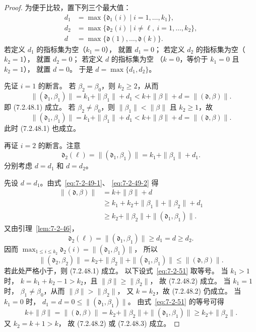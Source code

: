 \begin{proof}
为便于比较，置下列三个最大值：
\[
\begin{aligned}
d_1&=\max\{\mathfrak d_1(i)\mid i=1,\ldots,k_1\},\\
d_2&=\max\{\mathfrak d_2(i)\mid i\ne\ell,
\ i=1,\ldots,k_2\},\\
d&=\max\{\mathfrak d(1),\ldots,\mathfrak d(k)\}.
\end{aligned}
\]
若定义 $d_1$ 的指标集为空（$k_1=0$），
就置 $d_1=0$；
若定义 $d_2$ 的指标集为空（$k_2=1$），
就置 $d_2=0$；
若定义 $d$ 的指标集为空
（$k=0$，等价于 $k_1=0$ 且 $k_2=1$），
就置 $d=0$。
于是 $d=\max\{d_1,d_2\}$。

先证 $i=1$ 的断言。
若 $\beta_2=\beta_0$，则 $k_2\ge2$，从而
\[
\|(\mathfrak d_1,\beta_1)\|
=k_1+\|\beta_1\|+d_1
<k+\|\beta\|+d
=\|(\mathfrak d,\beta)\|.
\]
即 (7.2.48.1) 成立。
若 $\beta_2\ne\beta_0$，则
$\|\beta_1\|<\|\beta\|$ 且 $k_2\ge1$，故
\[
\|(\mathfrak d_1,\beta_1)\|
=k_1+\|\beta_1\|+d_1
<k+\|\beta\|+d
=\|(\mathfrak d,\beta)\|.
\]
此时 (7.2.48.1) 也成立。

再证 $i=2$ 的断言。注意
\[
\mathfrak d_2(\ell)
=\|(\mathfrak d_1,\beta_1)\|
=k_1+\|\beta_1\|+d_1.
\]
分别考虑 $d=d_1$ 和 $d=d_2$。

先设 $d=d_1$。由式~\eqref{eq:7-2-49-1}、
\eqref{eq:7-2-49-2} 得
\[
\begin{aligned}
\|(\mathfrak d,\beta)\|
&=k+\|\beta\|+d\\
&\ge k_1+k_2+\|\beta_1\|+\|\beta_2\|+d_1\\
&\ge k_2+\|\beta_2\|
+\|(\mathfrak d_1,\beta_1)\|.
\end{aligned}
\]
又由引理~\ref{lem:7-2-46}，
\[
\mathfrak d_2(\ell)
=\|(\mathfrak d_1,\beta_1)\|
\ge d_1=d\ge d_2.
\]
因而
$\max_{1\le i\le k_2}\mathfrak d_2(i)
=\|(\mathfrak d_1,\beta_1)\|$，
所以
\begin{equation}
\|(\mathfrak d_2,\beta_2)\|
=k_2+\|\beta_2\|
+\|(\mathfrak d_1,\beta_1)\|
\le\|(\mathfrak d,\beta)\|.
\tag{7.2.51}\label{eq:7-2-51}
\end{equation}
若此处严格小于，则 (7.2.48.1) 成立。
以下设式~\eqref{eq:7-2-51} 取等号。
当 $k_1>1$ 时，
$k=k_1+k_2-1>k_2$，且
$\|\beta\|\ge\|\beta_2\|$，
故 (7.2.48.2) 成立。
当 $k_1=1$ 时，
$\beta_1\ne\beta_0$，从而
$\|\beta\|>\|\beta_2\|$，
又 $k=k_2$，故 (7.2.48.2) 仍成立。
当 $k_1=0$ 时，
$d_1=d=0\le\|(\mathfrak d_1,\beta_1)\|$。
由式~\eqref{eq:7-2-51} 的等号可得
\[
k+\|\beta\|
=\|(\mathfrak d,\beta)\|
=k_2+\|\beta_2\|
+\|(\mathfrak d_1,\beta_1)\|
\ge k_2+\|\beta_2\|.
\]
又 $k_2=k+1>k$，
故 (7.2.48.2) 或 (7.2.48.3) 成立。


\end{proof}
